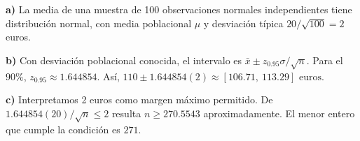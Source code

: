 \textbf{a)} La media de una muestra de 100 observaciones normales
independientes tiene distribución normal, con media poblacional
$\mu$ y desviación típica $20/\sqrt{100}=2$ euros.

\textbf{b)} Con desviación poblacional conocida, el intervalo es
$\bar x\pm z_{0.95}\sigma/\sqrt n$. Para el $90\%$,
$z_{0.95}\approx1.644854$. Así,
$110\pm 1.644854(2)\approx\boxed{[106.71,\ 113.29]\text{ euros}}$.

\textbf{c)} Interpretamos 2 euros como margen máximo permitido.
De $1.644854(20)/\sqrt n\le2$ resulta $n\ge270.5543$ aproximadamente.
El menor entero que cumple la condición es $\boxed{271}$.
